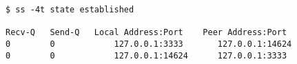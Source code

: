 \documentclass[varwidth=50em,crop]{standalone}
\begin{document}
\begin{verbatim}
$ ss -4t state established

Recv-Q   Send-Q   Local Address:Port    Peer Address:Port     
0        0            127.0.0.1:3333       127.0.0.1:14624
0        0            127.0.0.1:14624      127.0.0.1:3333
\end{verbatim}
\end{document}
